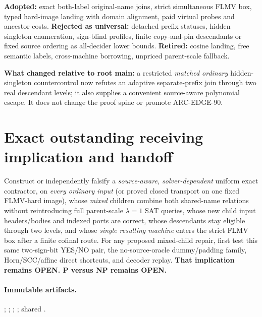 \documentclass[11pt]{article}
\begin{document}
\noindent\textbf{Adopted:} exact both-label original-name joins,
strict simultaneous FLMV box, typed hard-image landing with
domain alignment, paid virtual probes and ancestor costs.
\textbf{Rejected as universal:} detached prefix statuses,
hidden singleton enumeration, sign-blind profiles, finite
copy-and-pin descendants or fixed source ordering as
all-decider lower bounds. \textbf{Retired:} cosine landing,
free semantic labels, cross-machine borrowing,
unpriced parent-scale fallback.

\noindent\textbf{What changed relative to root main:}
a restricted \emph{matched ordinary} hidden-singleton countercontrol
now refutes an adaptive separate-prefix join through two real
descendant levels; it also supplies a convenient source-aware
polynomial escape. It does not change the proof spine or promote
ARC-EDGE-90.

\section{Exact outstanding receiving implication and handoff}
Construct or independently falsify a \emph{source-aware, solver-dependent}
uniform exact contractor, on \emph{every ordinary input} (or proved
closed transport on one fixed FLMV-hard image), whose \emph{mixed}
children combine both shared-name relations without reintroducing
full parent-scale $\lambda=1$ SAT queries, whose new child input
headers/bodies and indexed ports are correct, whose descendants
stay eligible through two levels, and whose \emph{single resulting
machine} enters the strict FLMV box after a finite cofinal route.
For any proposed mixed-child repair, first test this same
two-sign-bit YES/NO pair, the no-source-oracle dummy/padding
family, Horn/SCC/affine direct shortcuts, and decoder replay.
\textbf{That implication remains OPEN. P versus NP remains OPEN.}

\paragraph{Immutable artifacts.}
;
;
;
;
shared
.
\end{document}
